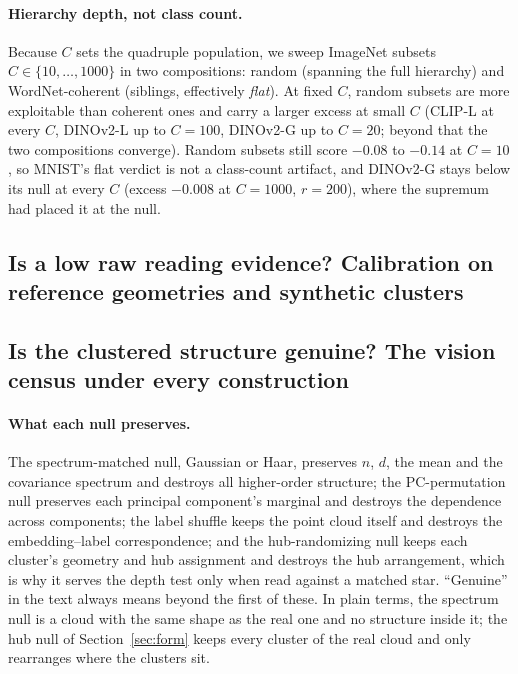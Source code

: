 \documentclass{article}
\theoremstyle{definition}
\theoremstyle{plain}
\theoremstyle{remark}
\begin{document}
\paragraph{Hierarchy depth, not class count.} Because $C$ sets the quadruple population, we sweep ImageNet subsets $C\in\{10,\dots,1000\}$ in two compositions: random (spanning the full hierarchy) and WordNet-coherent (siblings, effectively \emph{flat}). At fixed $C$, random subsets are more exploitable than coherent ones and carry a larger excess at small $C$ (CLIP-L at every $C$, DINOv2-L up to $C{=}100$, DINOv2-G up to $C{=}20$; beyond that the two compositions converge). Random subsets still score $-0.08$ to $-0.14$ at $C{=}10$, so MNIST's flat verdict is not a class-count artifact, and DINOv2-G stays below its null at every $C$ (excess $-0.008$ at $C{=}1000$, $r{=}200$), where the supremum had placed it at the null. %


\FloatBarrier
\subsection{Is a low raw reading evidence? Calibration on reference geometries and synthetic clusters}
\label{app:calibration}
\label{app:star}


\FloatBarrier
\subsection{Is the clustered structure genuine? The vision census under every construction}
\label{app:census}
\label{app:nulls}
\paragraph{What each null preserves.} The spectrum-matched null, Gaussian or Haar, preserves $n$, $d$, the mean and the covariance spectrum and destroys all higher-order structure; the PC-permutation null preserves each principal component's marginal and destroys the dependence across components; the label shuffle keeps the point cloud itself and destroys the embedding--label correspondence; and the hub-randomizing null keeps each cluster's geometry and hub assignment and destroys the hub arrangement, which is why it serves the depth test only when read against a matched star. ``Genuine'' in the text always means beyond the first of these. In plain terms, the spectrum null is a cloud with the same shape as the real one and no structure inside it; the hub null of Section~\ref{sec:form} keeps every cluster of the real cloud and only rearranges where the clusters sit.

\end{document}
